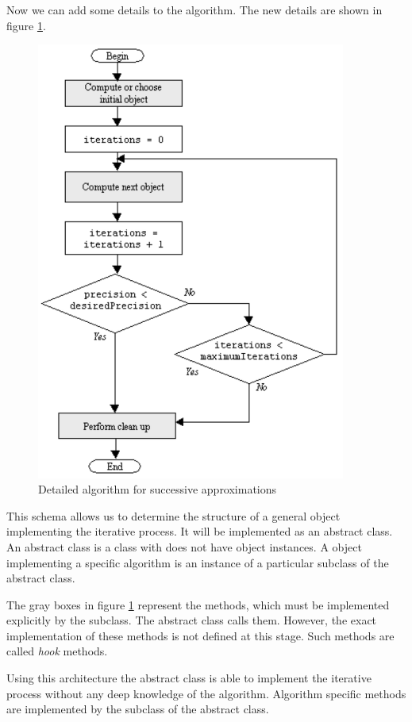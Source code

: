 \documentclass[twoside]{book}
\begin{document}
 Now we can add some details to the
algorithm. The new details are shown in figure \ref{fig:iterfine}.
\begin{figure}
\centering\includegraphics[width=4in]{Figures/IterationFineFlow}
\caption{Detailed algorithm for successive
approximations}\label{fig:iterfine}
\end{figure}
This schema allows us to determine the structure of a general
object implementing the iterative process. It will be implemented
as an abstract class. An abstract class is a class with does not
have object instances. A object implementing a specific algorithm
is an instance of a particular subclass of the abstract class.

The gray boxes in figure \ref{fig:iterfine} represent the methods,
which must be implemented explicitly by the subclass. The abstract
class calls them. However, the exact implementation of these
methods is not defined at this stage. Such methods are called {\sl
hook} methods.

Using this architecture the abstract class is able to implement
the iterative process without any deep knowledge of the algorithm.
Algorithm specific methods are implemented by the subclass of the
abstract class.
\end{document}
